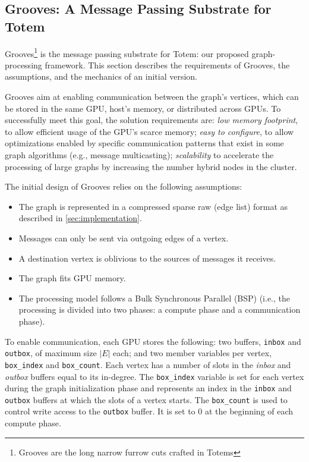 \subsection{Grooves: A Message Passing Substrate for Totem}
\label{sec:grooves}

{\sc Grooves}\footnote{Grooves are the long narrow furrow cuts crafted in Totems} is the message passing substrate for {\sc Totem}: our proposed graph-processing framework. This section describes the requirements of {\sc Grooves}, the assumptions, and the mechanics of an initial version. 

Grooves aim at enabling communication between the graph's vertices, which can be stored in the same GPU, host's memory, or distributed across GPUs. To successfully meet this goal, the solution requirements are: \emph{low memory footprint}, to allow efficient usage of the GPU's scarce memory; \emph{easy to configure}, to allow optimizations enabled by specific communication patterns that exist in some graph algorithms (e.g., message multicasting); {\em scalability} to accelerate the processing of large graphs by increasing the number hybrid nodes in the cluster.

The initial design of Grooves relies on the following assumptions: 
\begin{itemize}
\item The graph is represented in a compressed sparse raw (edge list) format as described in \ref{sec:implementation}.
\item Messages can only be sent via outgoing edges of a vertex.
\item A destination vertex is oblivious to the sources of messages it receives.
\item The graph fits GPU memory.
\item The processing model follows a Bulk Synchronous Parallel (BSP) (i.e., the processing is divided into two phases: a compute phase and a communication phase).
\end{itemize}

To enable communication, each GPU stores the following: two buffers, \texttt{inbox} and \texttt{outbox}, of maximum size $|E|$ each; and two member variables per vertex, \texttt{box\_index} and \texttt{box\_count}. Each vertex has a number of slots in the \emph{inbox} and \emph{outbox} buffers equal to its in-degree. The \texttt{box\_index} variable is set for each vertex during the graph initialization phase and represents an index in the \texttt{inbox} and \texttt{outbox} buffers at which the slots of a vertex starts. The \texttt{box\_count} is used to control write access to the \texttt{outbox} buffer. It is set to 0 at the beginning of each compute phase. 

